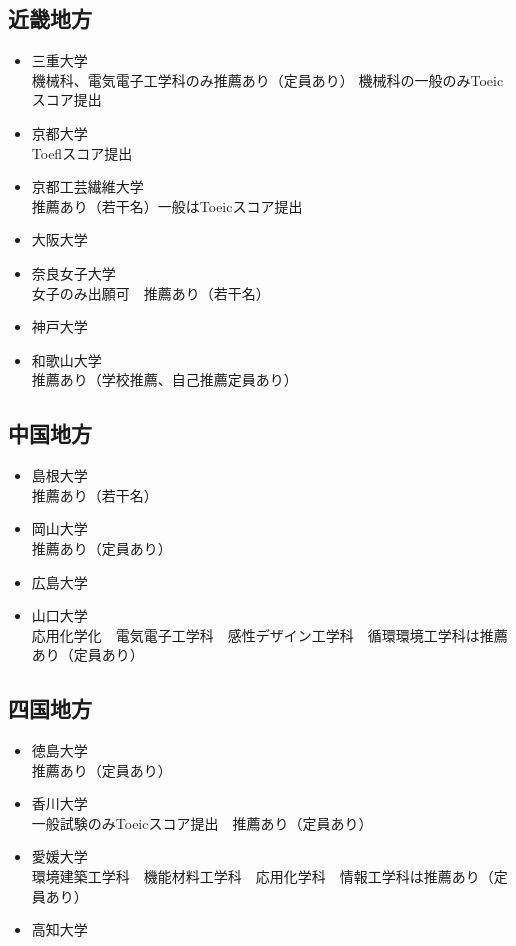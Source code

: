 \documentclass[platex, dvipdfmx, a4paper]{jarticle}
\begin{document}
      \subsection{近畿地方}
        \begin{itemize}
          \item 三重大学
            \\機械科、電気電子工学科のみ推薦あり（定員あり） 機械科の一般のみToeicスコア提出
          \item 京都大学
            \\Toeflスコア提出
          \item 京都工芸繊維大学
            \\推薦あり（若干名）一般はToeicスコア提出
          \item 大阪大学
          \item 奈良女子大学
            \\女子のみ出願可　推薦あり（若干名）
          \item 神戸大学
          \item 和歌山大学
            \\推薦あり（学校推薦、自己推薦定員あり）
        \end{itemize}
      \subsection{中国地方}
        \begin{itemize}
          \item 島根大学
            \\推薦あり（若干名）
          \item 岡山大学
            \\推薦あり（定員あり）
          \item 広島大学
          \item 山口大学
            \\応用化学化　電気電子工学科　感性デザイン工学科　循環環境工学科は推薦あり（定員あり）
        \end{itemize}
      \subsection{四国地方}
        \begin{itemize}
          \item 徳島大学
            \\推薦あり（定員あり）
          \item 香川大学
            \\一般試験のみToeicスコア提出　推薦あり（定員あり）
          \item 愛媛大学
            \\環境建築工学科　機能材料工学科　応用化学科　情報工学科は推薦あり（定員あり）
          \item 高知大学
        \end{itemize}
\end{document}
